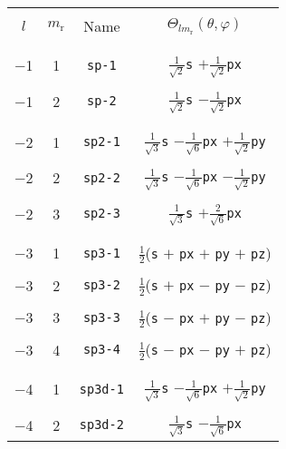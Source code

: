 \begin{table}
\begin{center}
\begin{tabular}{|cccc|}
\hline\hline
&&&\\
$l$ & $m_{\mathrm{r}}$ & Name & $\Theta_{lm_{\mathrm{r}}}(\theta,\varphi)$ \\
&&&\\\hline&&&\\
 $-$1  &  1  &  \verb#sp-1#   &
$\frac{1}{\sqrt{2}}$\verb#s# $+\frac{1}{\sqrt{2}}$\verb#px# \\
&&&\\
 $-$1  &  2  &  \verb#sp-2#   &
$\frac{1}{\sqrt{2}}$\verb#s# $-\frac{1}{\sqrt{2}}$\verb#px# \\
&&&\\\hline&&&\\
 $-$2  &  1  &  \verb#sp2-1#   &
$\frac{1}{\sqrt{3}}$\verb#s# $-\frac{1}{\sqrt{6}}$\verb#px#
$+\frac{1}{\sqrt{2}}$\verb#py# \\
&&&\\
 $-$2  &  2  &  \verb#sp2-2#   &
$\frac{1}{\sqrt{3}}$\verb#s# $-\frac{1}{\sqrt{6}}$\verb#px#
$-\frac{1}{\sqrt{2}}$\verb#py# \\
&&&\\
 $-$2  &  3  &  \verb#sp2-3#   &
$\frac{1}{\sqrt{3}}$\verb#s# $+\frac{2}{\sqrt{6}}$\verb#px# \\
&&&\\\hline&&&\\
 $-$3  &  1  &  \verb#sp3-1#   &
$\frac{1}{2}$(\verb#s# $+$ \verb#px# $+$ \verb#py# $+$ \verb#pz#) \\
&&&\\
 $-$3  &  2  &  \verb#sp3-2#   &
$\frac{1}{2}$(\verb#s# $+$ \verb#px# $-$ \verb#py# $-$ \verb#pz#) \\
&&&\\
 $-$3  &  3  &  \verb#sp3-3#   &
$\frac{1}{2}$(\verb#s# $-$ \verb#px# $+$ \verb#py# $-$ \verb#pz#) \\
&&&\\
 $-$3  &  4  &  \verb#sp3-4#   &
$\frac{1}{2}$(\verb#s# $-$ \verb#px# $-$ \verb#py# $+$ \verb#pz#) \\
&&&\\\hline&&&\\
 $-$4  &  1  &  \verb#sp3d-1#  &
$\frac{1}{\sqrt{3}}$\verb#s# $-\frac{1}{\sqrt{6}}$\verb#px#
$+\frac{1}{\sqrt{2}}$\verb#py#\\
&&&\\
 $-$4  &  2  &  \verb#sp3d-2#  &
$\frac{1}{\sqrt{3}}$\verb#s# $-\frac{1}{\sqrt{6}}$\verb#px#

\end{tabular}
\end{center}
\end{table}
